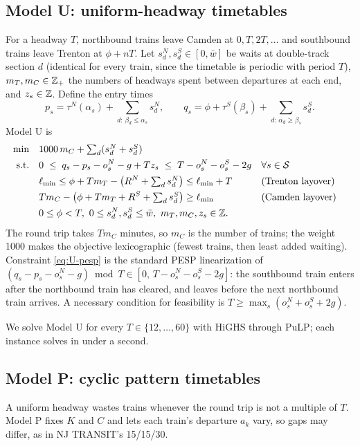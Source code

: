 \documentclass[11pt]{article}
\begin{document}
\subsection{Model U: uniform-headway timetables}\label{sec:modelU}
For a headway $T$, northbound trains leave Camden at $0,T,2T,\dots$ and southbound trains leave Trenton at $\phi+nT$. Let $s^N_d,s^S_d\in[0,\bar w]$ be waits at double-track section $d$ (identical for every train, since the timetable is periodic with period $T$), $m_T,m_C\in\mathbb{Z}_+$ the numbers of headways spent between departures at each end, and $z_s\in\mathbb{Z}$. Define the entry times
\[p_s=\tau^N(\alpha_s)+\sum_{d:\,\beta_d\le\alpha_s}s^N_d,\qquad q_s=\phi+\tau^S(\beta_s)+\sum_{d:\,\alpha_d\ge\beta_s}s^S_d.\]
Model U is
\begin{align}
\min\quad & 1000\,m_C+\textstyle\sum_d (s^N_d+s^S_d) \label{eq:U-obj}\\
\text{s.t.}\quad & 0\;\le\; q_s-p_s-o^N_s-g+T z_s\;\le\; T-o^N_s-o^S_s-2g && \forall s\in\mathcal{S} \label{eq:U-pesp}\\
& \ell_{\min}\le \phi+Tm_T-\bigl(R^N+\textstyle\sum_d s^N_d\bigr)\le \ell_{\min}+T && \text{(Trenton layover)} \\
& Tm_C-\bigl(\phi+Tm_T+R^S+\textstyle\sum_d s^S_d\bigr)\ge \ell_{\min} && \text{(Camden layover)} \\
& 0\le\phi<T,\ 0\le s^N_d,s^S_d\le\bar w,\ m_T,m_C,z_s\in\mathbb{Z}.
\end{align}
The round trip takes $Tm_C$ minutes, so $m_C$ is the number of trains; the weight 1000 makes the objective lexicographic (fewest trains, then least added waiting). Constraint \eqref{eq:U-pesp} is the standard PESP linearization of $(q_s-p_s-o^N_s-g)\bmod T\in[0,\,T-o^N_s-o^S_s-2g]$: the southbound train enters after the northbound train has cleared, and leaves before the next northbound train arrives. A necessary condition for feasibility is $T\ge \max_s(o^N_s+o^S_s+2g)$.

We solve Model U for every $T\in\{12,\dots,60\}$ with HiGHS through PuLP; each instance solves in under a second.

\subsection{Model P: cyclic pattern timetables}\label{sec:modelP}
A uniform headway wastes trains whenever the round trip is not a multiple of $T$. Model P fixes $K$ and $C$ and lets each train's departure $a_k$ vary, so gaps may differ, as in NJ TRANSIT's 15/15/30.
\end{document}
